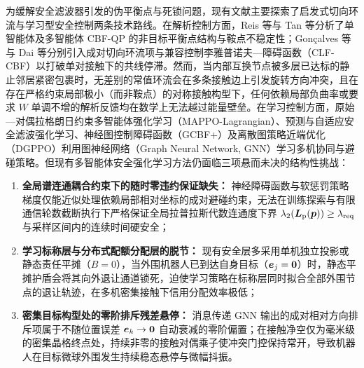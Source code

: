 为缓解安全滤波器引发的伪平衡点与死锁问题，现有文献主要探索了启发式切向环流与学习型安全控制两条技术路线。在解析控制方面，Reis 等\cite{reis2021}与 Tan 等\cite{tan2024equilibria}分析了单智能体及多智能体 CBF-QP 的非目标平衡点结构与鞍点不稳定性；Gon\c{c}alves 等\cite{goncalves2023circulation}与 Dai 等\cite{dai2024compatible}分别引入成对切向环流项与兼容控制李雅普诺夫—障碍函数（CLF-CBF）以打破单对接触下的共线停滞。然而，当内部互换节点被多层已达标的静止邻居紧密包裹时，无差别的常值环流会在多条接触边上引发旋转方向冲突，且在存在严格约束局部极小（而非鞍点）的对称接触构型下，任何依赖局部负曲率或要求 $W$ 单调不增的解析反馈均在数学上无法越过能量壁垒。在学习控制方面，原始—对偶拉格朗日约束多智能体强化学习（MAPPO-Lagrangian）\cite{gu2023safe}、预测与自适应安全滤波强化学习\cite{wabersich2021,liu2026saferl}、神经图控制障碍函数（GCBF+）\cite{zhang2025gcbf}及离散图策略近端优化（DGPPO）\cite{zhang2025dgppo}利用图神经网络（Graph Neural Network, GNN）学习多机协同与避碰策略。但现有多智能体安全强化学习方法仍面临三项悬而未决的结构性挑战：
\begin{enumerate}
 \item \textbf{全局谱连通耦合约束下的随时零违约保证缺失：} 神经障碍函数与软惩罚策略梯度仅能近似处理依赖局部相对坐标的成对避碰约束，无法在训练探索与有限通信轮数截断执行下严格保证全局拉普拉斯代数连通度下界 $\lambda_2(\boldsymbol{L}_{\mathrm{p}}(\boldsymbol{p}))\ge\lambda_{\mathrm{req}}$ 与采样区间内的连续时间硬安全；
 \item \textbf{学习标称层与分布式配额分配层的脱节：} 现有安全层多采用单机独立投影或静态责任平摊（$B=0$），当外围机器人已到达自身目标（$\boldsymbol{e}_j=\boldsymbol 0$）时，静态平摊护盾会将其向外退让通道锁死，迫使学习策略在标称层同时拟合全部外围节点的退让轨迹，在多机密集接触下信用分配效率极低；
 \item \textbf{密集目标构型处的零阶排斥残差悬停：} 消息传递 GNN 输出的成对相对方向排斥项属于不随位置误差 $\boldsymbol{e}_k\to\boldsymbol 0$ 自动衰减的零阶偏置；在接触净空仅为毫米级的密集晶格终点处，持续非零的接触对偶乘子使冲突门控保持常开，导致机器人在目标微球外围发生持续稳态悬停与微幅抖振。
\end{enumerate}

